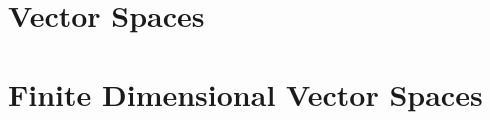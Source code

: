 \documentclass[12pt]{report}
\begin{document}
  \raggedright

  

  \chapter{Vector Spaces}
  
  

  \chapter*{Finite Dimensional Vector Spaces}
  
  
  
\end{document}
